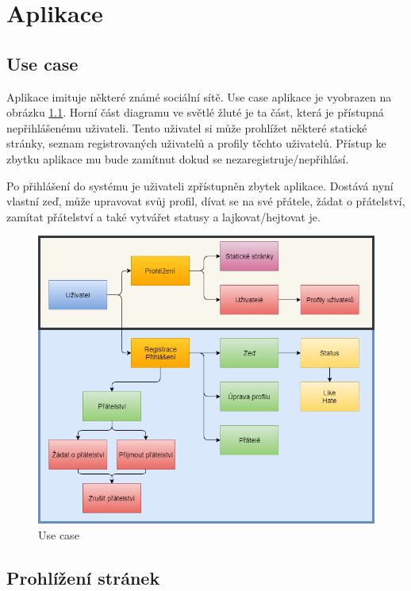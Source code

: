 \documentclass[
12pt,
a4paper,
pdftex,
czech,
titlepage
]{report}
\begin{document}
\chapter{Aplikace}

\section{Use case}

Aplikace imituje některé známé sociální sítě. Use case aplikace je vyobrazen na obrázku \ref{use_case}.
Horní část diagramu ve světlé žluté je ta část, která je přístupná nepřihlášenému uživateli. Tento uživatel si může prohlížet některé statické stránky, seznam registrovaných uživatelů a profily těchto uživatelů. Přístup ke zbytku aplikace mu bude zamítnut dokud se nezaregistruje/nepřihlásí.

Po přihlášení do systému je uživateli zpřístupněn zbytek aplikace. Dostává nyní vlastní zeď, může upravovat svůj profil, dívat se na své přátele, žádat o přátelství, zamítat přátelství a také vytvářet statusy a lajkovat/hejtovat je. 

\begin{figure}[H]
\caption{Use case}
\label{use_case}
\includegraphics[width=\textwidth]{use_case.png}
\end{figure}

\section{Prohlížení stránek}
\end{document}
